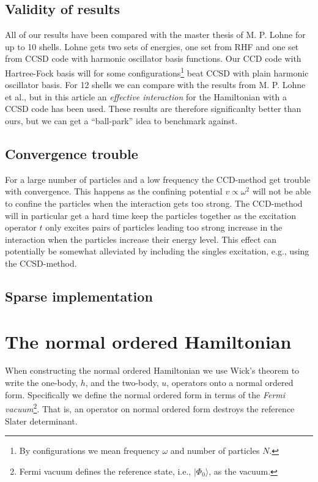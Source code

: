 \documentclass[
    a4paper, aps, twocolumn, floatfix, superscriptaddress,
    nofootinbib]{revtex4-1}
\newcommand{\1}{\mathds{1}}
\newcommand{\ket}[1]{\rvert #1\rangle}
\newcommand{\kslat}{\ket{\Phi_0}}
\begin{document}
    \subsection{Validity of results}
        All of our results have been compared with the master thesis of M. P.
        Lohne\cite{lohne2010coupled} for up to 10 shells. Lohne gets two sets of
        energies, one set from RHF and one set from CCSD code with harmonic
        oscillator basis functions. Our CCD code with Hartree-Fock basis will
        for some configurations\footnote{By configurations we mean frequency
        $\omega$ and number of particles $N$.} beat CCSD with plain harmonic
        oscillator basis. For 12 shells we can compare with the results from M.
        P. Lohne et al.\cite{lohne2011ab}, but in this article an
        \emph{effective interaction} for the Hamiltonian with a CCSD code has
        been used. These results are therefore significanlty better than ours,
        but we can get a ``ball-park'' idea to benchmark against.

    \subsection{Convergence trouble}
        For a large number of particles and a low frequency the CCD-method get
        trouble with convergence. This happens as the confining potential $v
        \propto \omega^2$ will not be able to confine the particles when the
        interaction gets too strong. The CCD-method will in particular get a
        hard time keep the particles together as the excitation operator $t$
        only excites pairs of particles leading too strong increase in the
        interaction when the particles increase their energy level. This effect
        can potentially be somewhat alleviated by including the singles
        excitation, e.g., using the CCSD-method.


    \subsection{Sparse implementation}

\appendix
\section{The normal ordered Hamiltonian}
    When constructing the normal ordered Hamiltonian we use Wick's theorem to
    write the one-body, $h$, and the two-body, $u$, operators onto a normal
    ordered form. Specifically we define the normal ordered form in terms of the
    \emph{Fermi vacuum}\footnote{Fermi vacuum defines the reference state, i.e.,
    $\kslat$, as the vacuum.}. That is, an operator on normal ordered form
    destroys the reference Slater determinant.
\end{document}
